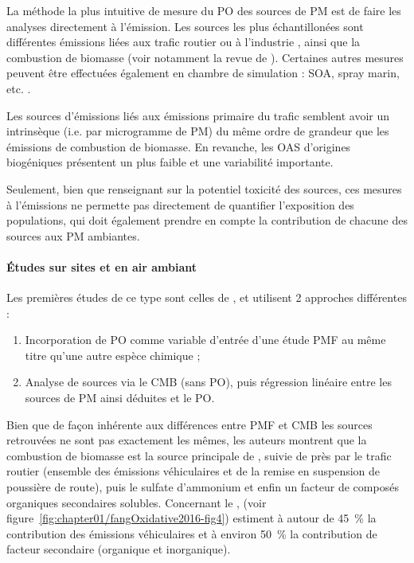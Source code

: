 La méthode la plus intuitive de mesure du PO des sources de PM est de faire les analyses
directement à l'émission. Les sources les plus échantillonées sont différentes émissions
liées aux trafic routier \parencite{biswasOxidative2009,parkDifferential2018} ou à l'industrie
\cite{jooPhysicochemical2018}, ainsi que la combustion de biomasse
\parencite{jiangOxidative2016,parkDifferential2018} (voir notamment la revue de \cite{batesReview2019}).
Certaines autres mesures peuvent être effectuées également en chambre de simulation : SOA, spray marin, etc.
\parencite{parkDifferential2018}.

Les sources d'émissions liés aux émissions primaire du trafic semblent avoir un \PODTTm{}
intrinsèque (i.e. par microgramme de PM) du même ordre de grandeur que les émissions de
combustion de biomasse. En revanche, les OAS d'origines biogéniques présentent un \PODTTm{}
plus faible et une variabilité importante.


Seulement, bien que renseignant sur la potentiel toxicité des sources, ces mesures à
l'émissions ne permette pas directement de quantifier l'exposition des populations, qui
doit également prendre en compte la contribution de chacune des sources aux PM ambiantes.

\paragraph{Études sur sites et en air ambiant}%
\label{par:études_sur_sites_et_en_air_ambiant}

Les premières études de ce type sont celles de
\cite{vermaReactive2014,batesReactive2015,fangOxidative2016}, et utilisent 2 approches
différentes :
\begin{enumerate}
    \item Incorporation de PO comme variable d'entrée d'une étude PMF au même titre qu'une
        autre espèce chimique ;
    \item Analyse de sources via le CMB (sans PO), puis régression linéaire entre les
        sources de PM ainsi déduites et le PO.
\end{enumerate}
Bien que de façon inhérente aux différences entre PMF et CMB les sources retrouvées ne
sont pas exactement les mêmes, les auteurs montrent que la combustion de biomasse est la source
principale de \PODTTv, suivie de près par le trafic routier (ensemble des émissions
véhiculaires et de la remise en suspension de poussière de route), puis le sulfate
d'ammonium et enfin un facteur de composés organiques secondaires solubles.
Concernant le \POAAv, \cite{fangOxidative2016} (voir
figure~\ref{fig:chapter01/fangOxidative2016-fig4}) estiment à autour de \SI{45}{\percent} la
contribution des émissions véhiculaires et à environ \SI{50}{\percent} la contribution de
facteur secondaire (organique et inorganique).

